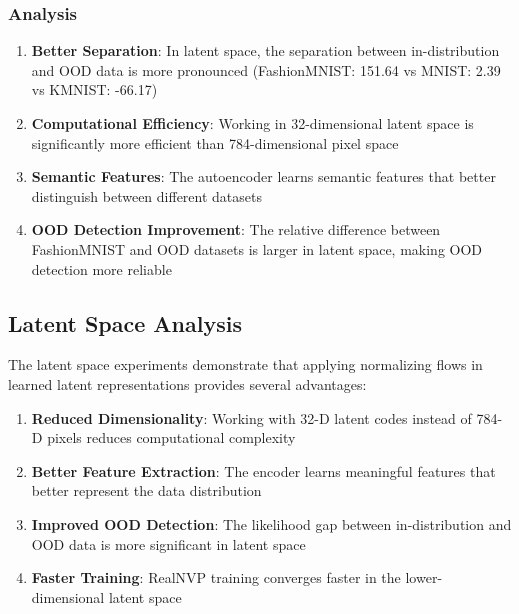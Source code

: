 \documentclass[conference,12pt]{IEEEtran}
\begin{document}
\subsubsection{Analysis}

\begin{enumerate}
    \item \textbf{Better Separation}: In latent space, the separation between in-distribution and OOD data is more pronounced (FashionMNIST: 151.64 vs MNIST: 2.39 vs KMNIST: -66.17)
    
    \item \textbf{Computational Efficiency}: Working in 32-dimensional latent space is significantly more efficient than 784-dimensional pixel space
    
    \item \textbf{Semantic Features}: The autoencoder learns semantic features that better distinguish between different datasets
    
    \item \textbf{OOD Detection Improvement}: The relative difference between FashionMNIST and OOD datasets is larger in latent space, making OOD detection more reliable
\end{enumerate}

\subsection{Latent Space Analysis}

The latent space experiments demonstrate that applying normalizing flows in learned latent representations provides several advantages:

\begin{enumerate}
    \item \textbf{Reduced Dimensionality}: Working with 32-D latent codes instead of 784-D pixels reduces computational complexity
    
    \item \textbf{Better Feature Extraction}: The encoder learns meaningful features that better represent the data distribution
    
    \item \textbf{Improved OOD Detection}: The likelihood gap between in-distribution and OOD data is more significant in latent space
    
    \item \textbf{Faster Training}: RealNVP training converges faster in the lower-dimensional latent space
\end{enumerate}
\end{document}
